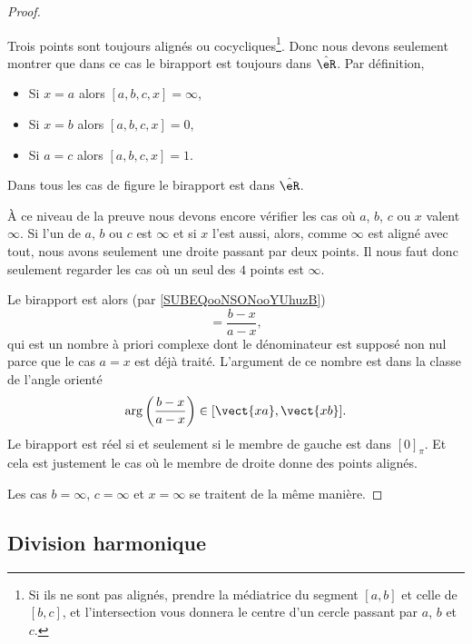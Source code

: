 \begin{proof}
\begin{subproof}
		Trois points sont toujours alignés ou cocycliques\footnote{Si ils ne sont pas alignés, prendre la médiatrice du segment \( [a,b]\) et celle de \( [b,c]\), et l'intersection vous donnera le centre d'un cercle passant par \( a\), \( b\) et \( c\).}. Donc nous devons seulement montrer que dans ce cas le birapport est toujours dans \( \hat \eR\). Par définition,
		\begin{itemize}
			\item Si \( x=a\) alors \( [a,b,c,x]=\infty\),
			\item Si \( x=b\) alors \( [a,b,c,x]=0\),
			\item Si \( a=c\) alors \( [a,b,c,x]=1\).
		\end{itemize}
		Dans tous les cas de figure le birapport est dans \( \hat \eR\).

	\end{subproof}

	À ce niveau de la preuve nous devons encore vérifier les cas où \( a\), \( b\), \( c\) ou \( x\) valent \( \infty\). Si l'un de \( a\), \( b\) ou \( c\) est \( \infty\) et si \( x\) l'est aussi, alors, comme \( \infty\) est aligné avec tout, nous avons seulement une droite passant par deux points. Il nous faut donc seulement regarder les cas où un seul des \( 4\) points est \( \infty\).

	\begin{subproof}
		\spitem[Si \( a=\infty\)]
		Le birapport est alors (par \eqref{SUBEQooNSONooYUhuzB})
		\begin{equation}
			[\infty,b,c,x]=\frac{ b-x }{ a-x },
		\end{equation}
		qui est un nombre à priori complexe dont le dénominateur est supposé non nul parce que le cas \( a=x\) est déjà traité. L'argument de ce nombre est dans la classe de l'angle orienté
		\begin{equation}
			\arg\left( \frac{ b-x }{ a-x } \right)\in[\vect{ xa },\vect{ xb }].
		\end{equation}
		Le birapport est réel si et seulement si le membre de gauche est dans \( [0]_{\pi}\). Et cela est justement le cas où le membre de droite donne des points alignés.
	\end{subproof}
	Les cas \( b=\infty\), \( c=\infty\) et \( x=\infty\) se traitent de la même manière.
\end{proof}

\subsection{Division harmonique}

